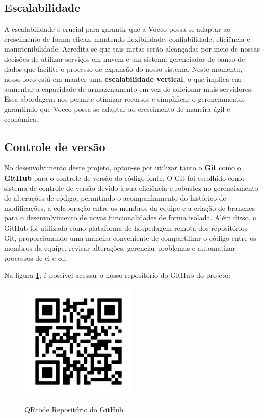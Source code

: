 \subsection{Escalabilidade}
A escalabilidade é crucial para garantir que a Vocco possa se adaptar ao crescimento de forma eficaz, mantendo flexibilidade, confiabilidade, eficiência e manutenibilidade. Acredita-se  que tais metas serão alcançadas por meio de nossas decisões de utilizar serviços em nuvem e um sistema gerenciador de banco de dados que facilite o processo de expansão do nosso sistema. Neste momento, nosso foco está em manter uma \textbf{escalabilidade vertical}, o que implica em aumentar a capacidade de armazenamento em vez de adicionar mais servidores. Essa abordagem nos permite otimizar recursos e simplificar o gerenciamento, garantindo que Vocco possa se adaptar ao crescimento de maneira ágil e econômica.
\subsection{Controle de versão}
 No desenvolvimento deste projeto, optou-se por utilizar tanto o \textbf{Git} como o \textbf{GitHub} para o controle de versão do código-fonte. O Git foi escolhido como sistema de controle de versão devido à sua eficiência e robustez no gerenciamento de alterações de código, permitindo o acompanhamento do histórico de modificações, a colaboração entre os membros da equipe e a criação de branches para o desenvolvimento de novas funcionalidades de forma isolada. Além disso, o GitHub foi utilizado como plataforma de hospedagem remota dos repositórios Git, proporcionando uma maneira conveniente de compartilhar o código entre os membros da equipe, revisar alterações, gerenciar problemas e automatizar processos de \ac{ci} e \ac{cd}.

 Na figura \ref{github}, é possível acessar o nosso repositório do GitHub do projeto: 

\begin{figure}[ht]
        \centering
        \href{https://github.com/betatrix/Projeto-Integrado-I}{
        \includegraphics[width=0.5\textwidth]{images/qrcode-repo-github.png}
        }
        \caption{QRcode Repositório do GitHub}
        \label{github}
\end{figure}
 
